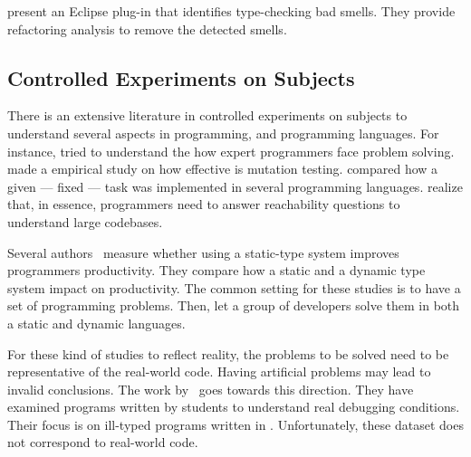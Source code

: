 \cite{tsantalisJDeodorantIdentificationRemoval2008} present an Eclipse plug-in that identifies type-checking bad smells.
They provide refactoring analysis to remove the detected smells.

\subsection*{Controlled Experiments on Subjects}
\label{sec:lr:experiments}

There is an extensive literature \perse{} in controlled experiments on subjects to understand several aspects in programming, and programming languages.
For instance, \cite{solowayEmpiricalStudiesProgramming1984} tried to understand the how expert programmers face problem solving.
\cite{buddTheoreticalEmpiricalStudies1980} made a empirical study on how effective is mutation testing.
\cite{precheltEmpiricalComparisonSeven2000} compared how a given --- fixed --- task was implemented in several programming languages.
%
\cite{latozaDevelopersAskReachability2010} realize that, in essence, programmers need to answer reachability questions to understand large codebases.

Several authors~\cite{stuchlikStaticVsDynamic2011,mayerEmpiricalStudyInfluence2012,harlinImpactUsingStaticType2017} measure whether using a static-type system improves programmers productivity.
They compare how a static and a dynamic type system impact on productivity.
The common setting for these studies is to have a set of programming problems.
Then, let a group of developers solve them in both a static and dynamic languages.

For these kind of studies to reflect reality, the problems to be solved need to be representative of the real-world code.
Having artificial problems may lead to invalid conclusions.
The work by~\cite{wuHowTypeErrors2017,wuLearningUserFriendly2017} goes towards this direction. 
They have examined programs written by students to understand real debugging conditions. 
Their focus is on ill-typed programs written in \haskell{}.
Unfortunately, these dataset does not correspond to real-world code. 

